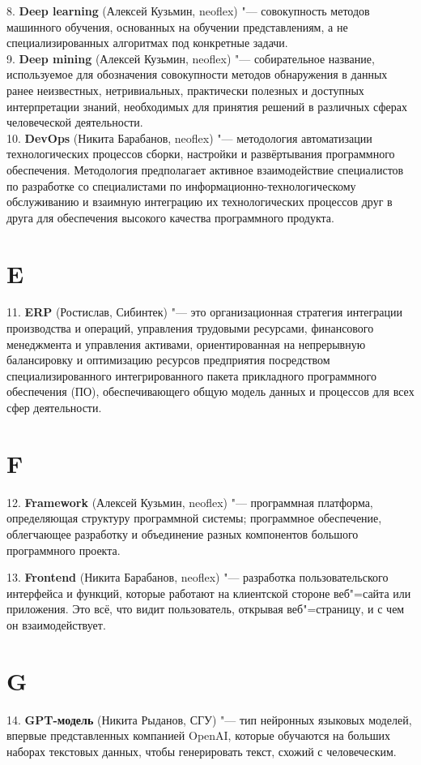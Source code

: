 \documentclass[14 pt]{extarticle}
\begin{document}
    8. \textbf{Deep learning} (Алексей Кузьмин, neoflex) "--- совокупность методов машинного обучения, основанных на обучении представлениям, а не специализированных алгоритмах под конкретные задачи. \\

    9. \textbf{Deep mining} (Алексей Кузьмин, neoflex) "--- собирательное название, используемое для обозначения совокупности методов обнаружения в данных ранее неизвестных, нетривиальных, практически полезных и доступных интерпретации знаний, необходимых для принятия решений в различных сферах человеческой деятельности. \\

    10. \textbf{DevOps} (Никита Барабанов, neoflex) "--- методология автоматизации технологических процессов сборки, настройки и развёртывания программного обеспечения. Методология предполагает активное взаимодействие специалистов по разработке со специалистами по информационно-технологическому обслуживанию и взаимную интеграцию их технологических процессов друг в друга для обеспечения высокого качества программного продукта.

\section*{E}
    11. \textbf{ERP} (Ростислав, Сибинтек) "--- это организационная стратегия интеграции производства и операций, управления трудовыми ресурсами, финансового менеджмента и управления активами, ориентированная на непрерывную балансировку и оптимизацию ресурсов предприятия посредством специализированного интегрированного пакета прикладного программного обеспечения (ПО), обеспечивающего общую модель данных и процессов для всех сфер деятельности.

\section*{F}
    12. \textbf{Framework} (Алексей Кузьмин, neoflex) "--- программная платформа, определяющая структуру программной системы; программное обеспечение, облегчающее разработку и объединение разных компонентов большого программного проекта.
    
    13. \textbf{Frontend} (Никита Барабанов, neoflex) "--- разработка пользовательского интерфейса и функций, которые работают на клиентской стороне веб"=сайта или приложения. Это всё, что видит пользователь, открывая веб"=страницу, и с чем он взаимодействует.

\section*{G}
    14. \textbf{GPT-модель} (Никита Рыданов, СГУ) "--- тип нейронных языковых моделей, впервые представленных компанией OpenAI, которые обучаются на больших наборах текстовых данных, чтобы генерировать текст, схожий с человеческим. \\
    
\end{document}
